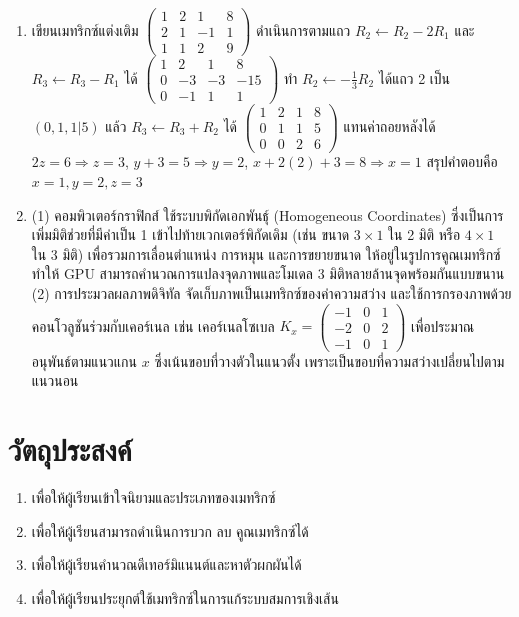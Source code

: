 \begin{enumerate}
    \item เขียนเมทริกซ์แต่งเติม $\left(\begin{array}{ccc|c} 1 & 2 & 1 & 8 \\ 2 & 1 & -1 & 1 \\ 1 & 1 & 2 & 9 \end{array}\right)$ ดำเนินการตามแถว $R_2 \leftarrow R_2 - 2R_1$ และ $R_3 \leftarrow R_3 - R_1$ ได้ $\left(\begin{array}{ccc|c} 1 & 2 & 1 & 8 \\ 0 & -3 & -3 & -15 \\ 0 & -1 & 1 & 1 \end{array}\right)$ ทำ $R_2 \leftarrow -\frac{1}{3}R_2$ ได้แถว 2 เป็น $(0, 1, 1 | 5)$ แล้ว $R_3 \leftarrow R_3 + R_2$ ได้ $\left(\begin{array}{ccc|c} 1 & 2 & 1 & 8 \\ 0 & 1 & 1 & 5 \\ 0 & 0 & 2 & 6 \end{array}\right)$ แทนค่าถอยหลังได้ $2z = 6 \Rightarrow z = 3$, $y + 3 = 5 \Rightarrow y = 2$, $x + 2(2) + 3 = 8 \Rightarrow x = 1$ สรุปคำตอบคือ $x = 1, y = 2, z = 3$

    \item (1) คอมพิวเตอร์กราฟิกส์ ใช้ระบบพิกัดเอกพันธุ์ (Homogeneous Coordinates) ซึ่งเป็นการเพิ่มมิติช่วยที่มีค่าเป็น 1 เข้าไปท้ายเวกเตอร์พิกัดเดิม (เช่น ขนาด $3 \times 1$ ใน 2 มิติ หรือ $4 \times 1$ ใน 3 มิติ) เพื่อรวมการเลื่อนตำแหน่ง การหมุน และการขยายขนาด ให้อยู่ในรูปการคูณเมทริกซ์ ทำให้ GPU สามารถคำนวณการแปลงจุดภาพและโมเดล 3 มิติหลายล้านจุดพร้อมกันแบบขนาน (2) การประมวลผลภาพดิจิทัล จัดเก็บภาพเป็นเมทริกซ์ของค่าความสว่าง และใช้การกรองภาพด้วยคอนโวลูชันร่วมกับเคอร์เนล เช่น เคอร์เนลโซเบล $K_x = \begin{pmatrix} -1 & 0 & 1 \\ -2 & 0 & 2 \\ -1 & 0 & 1 \end{pmatrix}$ เพื่อประมาณอนุพันธ์ตามแนวแกน $x$ ซึ่งเน้นขอบที่วางตัวในแนวตั้ง เพราะเป็นขอบที่ความสว่างเปลี่ยนไปตามแนวนอน
\end{enumerate}

\newpage
{}
\section*{วัตถุประสงค์}
\begin{enumerate}
    \item เพื่อให้ผู้เรียนเข้าใจนิยามและประเภทของเมทริกซ์
    \item เพื่อให้ผู้เรียนสามารถดำเนินการบวก ลบ คูณเมทริกซ์ได้
    \item เพื่อให้ผู้เรียนคำนวณดีเทอร์มิแนนต์และหาตัวผกผันได้
    \item เพื่อให้ผู้เรียนประยุกต์ใช้เมทริกซ์ในการแก้ระบบสมการเชิงเส้น
\end{enumerate}
